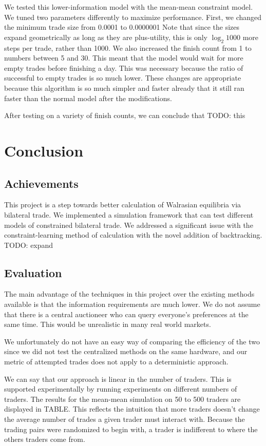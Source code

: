 \documentclass[12pt,a4paper,titlepage]{article}
\begin{document}
We tested this lower-information model with the mean-mean constraint model.
We tuned two parameters differently to maximize performance. 
First, we changed the minimum trade size from 0.0001 to 0.0000001 
Note that since the sizes expand geometrically as long as they are plus-utility, this is only $\log_2 1000$ more steps per trade, rather than 1000.
We also increased the finish count from 1 to numbers between 5 and 30.
This meant that the model would wait for more empty trades before finishing a day.
This was necessary because the ratio of successful to empty trades is so much lower.
These changes are appropriate because this algorithm is so much simpler and faster already that it still ran faster than the normal model after the modifications.

After testing on a variety of finish counts, we can conclude that
TODO: this

\section{Conclusion}\label{conclusion}

\subsection{Achievements}
This project is a step towards better calculation of Walrasian equilibria via bilateral trade.
We implemented a simulation framework that can test different models of constrained bilateral trade.
We addressed a significant issue with the constraint-learning method of calculation with the novel addition of backtracking.
TODO: expand


\subsection{Evaluation}
The main advantage of the techniques in this project over the existing methods available is that the information requirements are much lower. 
We do not assume that there is a central auctioneer who can query everyone's preferences at the same time.
This would be unrealistic in many real world markets.

We unfortunately do not have an easy way of comparing the efficiency of the two since we did not test the centralized methods on the same hardware, and our metric of attempted trades does not apply to a deterministic approach.

We can say that our approach is linear in the number of traders. 
This is supported experimentally by running experiments on different numbers of traders.
The results for the mean-mean simulation on 50 to 500 traders are displayed in TABLE.
This reflects the intuition that more traders doesn't change the average number of trades a given trader must interact with.
Because the trading pairs were randomized to begin with, a trader is indifferent to where the others traders come from.
\end{document}

